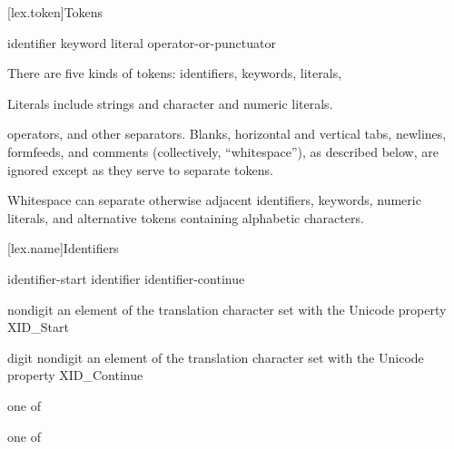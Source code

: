 [lex.token]{Tokens}

%
\begin{bnf}
\br
    identifier\br
    keyword\br
    literal\br
    operator-or-punctuator
\end{bnf}

\pnum
{}%
There are five kinds of tokens: identifiers, keywords, literals,%
\begin{footnote}
Literals include strings and character and numeric literals.
\end{footnote}
operators, and other separators.
%
Blanks, horizontal and vertical tabs, newlines, formfeeds, and comments
(collectively, ``whitespace''), as described below, are ignored except
as they serve to separate tokens.
\begin{note}
Whitespace can separate otherwise adjacent identifiers, keywords, numeric
literals, and alternative tokens containing alphabetic characters.
\end{note}

[lex.name]{Identifiers}

%
\begin{bnf}
\br
    identifier-start\br
    identifier identifier-continue
\end{bnf}

\begin{bnf}
\br
    nondigit\br
    \textnormal{an element of the translation character set with the Unicode property XID_Start}
\end{bnf}

\begin{bnf}
\br
    digit\br
    nondigit\br
    \textnormal{an element of the translation character set with the Unicode property XID_Continue}
\end{bnf}

\begin{bnf}
 \textnormal{one of}\br
    \br
    \br
    \br
\end{bnf}

\begin{bnf}
 \textnormal{one of}\br
\end{bnf}

